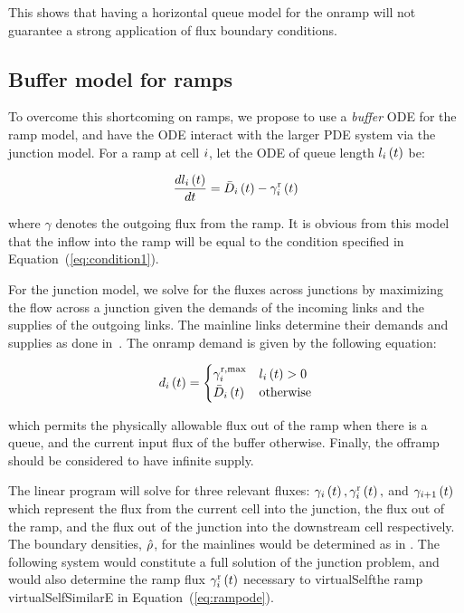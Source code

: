 This shows that having a horizontal queue model for the onramp will
not guarantee a strong application of flux boundary conditions.


\subsection{Buffer model for ramps\label{sub:Buffer-model-for}}

To overcome this shortcoming on ramps, we propose to use a \emph{buffer}
ODE for the ramp model, and have the ODE interact with the larger
PDE system via the junction model. For a ramp at cell $i$, let
the ODE of queue length $l_{i}\left(t\right)$ be:

\begin{equation}
\frac{dl_{i}\left(t\right)}{dt}=\bar{D}_{i}\left(t\right)-\gamma^{\text{r}}_{i}\left(t\right)\label{eq:rampode}
\end{equation}


where $\gamma$ denotes the outgoing flux from the ramp. It is obvious from this model
that the inflow into the ramp will be equal to the condition specified
in Equation~(\ref{eq:condition1}).

For the junction model, we solve for the fluxes across junctions by
maximizing the flow across a junction given the demands of the incoming
links and the supplies of the outgoing links. The mainline links determine
their demands and supplies as done in~\cite{garavello2006traffic}. The
onramp demand is given by the following equation:

\[
d_{i}\left(t\right)=\begin{cases}
\gamma_{i}^{\text{r,\ensuremath{\max}}} & l_{i}\left(t\right)>0\\
\bar{D}_{i}\left(t\right) & \text{otherwise}
\end{cases}
\]


which permits the physically allowable flux out of the ramp when there
is a queue, and the current input flux of the buffer otherwise. Finally,
the offramp should be considered to have infinite supply.

The linear program will solve for three relevant fluxes: $\gamma_{i}\left(t\right),\gamma^{\text{r}}_{i}\left(t\right),$
and $\gamma_{i+1}\left(t\right)$ which represent the flux from the current
cell into the junction, the flux out of the ramp, and the flux out
of the junction into the downstream cell respectively. The boundary
densities, $\hat{\rho}$, for the mainlines would be determined
as in \cite{garavello2006traffic}. The following system would constitute
a full solution of the junction problem, and would also determine
the ramp flux $\gamma^{\text{r}}_{i}\left(t\right)$ necessary to virtualSelfthe ramp virtualSelfSimilarE
in Equation~(\ref{eq:rampode}).


